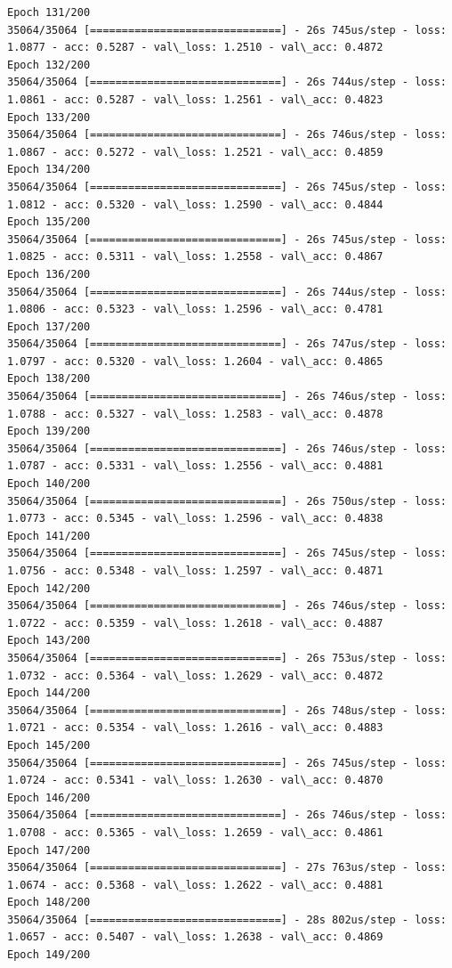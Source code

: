 \documentclass[11pt]{article}
\begin{document}
\begin{Verbatim}[commandchars=\\\{\}]
Epoch 131/200
35064/35064 [==============================] - 26s 745us/step - loss: 1.0877 - acc: 0.5287 - val\_loss: 1.2510 - val\_acc: 0.4872
Epoch 132/200
35064/35064 [==============================] - 26s 744us/step - loss: 1.0861 - acc: 0.5287 - val\_loss: 1.2561 - val\_acc: 0.4823
Epoch 133/200
35064/35064 [==============================] - 26s 746us/step - loss: 1.0867 - acc: 0.5272 - val\_loss: 1.2521 - val\_acc: 0.4859
Epoch 134/200
35064/35064 [==============================] - 26s 745us/step - loss: 1.0812 - acc: 0.5320 - val\_loss: 1.2590 - val\_acc: 0.4844
Epoch 135/200
35064/35064 [==============================] - 26s 745us/step - loss: 1.0825 - acc: 0.5311 - val\_loss: 1.2558 - val\_acc: 0.4867
Epoch 136/200
35064/35064 [==============================] - 26s 744us/step - loss: 1.0806 - acc: 0.5323 - val\_loss: 1.2596 - val\_acc: 0.4781
Epoch 137/200
35064/35064 [==============================] - 26s 747us/step - loss: 1.0797 - acc: 0.5320 - val\_loss: 1.2604 - val\_acc: 0.4865
Epoch 138/200
35064/35064 [==============================] - 26s 746us/step - loss: 1.0788 - acc: 0.5327 - val\_loss: 1.2583 - val\_acc: 0.4878
Epoch 139/200
35064/35064 [==============================] - 26s 746us/step - loss: 1.0787 - acc: 0.5331 - val\_loss: 1.2556 - val\_acc: 0.4881
Epoch 140/200
35064/35064 [==============================] - 26s 750us/step - loss: 1.0773 - acc: 0.5345 - val\_loss: 1.2596 - val\_acc: 0.4838
Epoch 141/200
35064/35064 [==============================] - 26s 745us/step - loss: 1.0756 - acc: 0.5348 - val\_loss: 1.2597 - val\_acc: 0.4871
Epoch 142/200
35064/35064 [==============================] - 26s 746us/step - loss: 1.0722 - acc: 0.5359 - val\_loss: 1.2618 - val\_acc: 0.4887
Epoch 143/200
35064/35064 [==============================] - 26s 753us/step - loss: 1.0732 - acc: 0.5364 - val\_loss: 1.2629 - val\_acc: 0.4872
Epoch 144/200
35064/35064 [==============================] - 26s 748us/step - loss: 1.0721 - acc: 0.5354 - val\_loss: 1.2616 - val\_acc: 0.4883
Epoch 145/200
35064/35064 [==============================] - 26s 745us/step - loss: 1.0724 - acc: 0.5341 - val\_loss: 1.2630 - val\_acc: 0.4870
Epoch 146/200
35064/35064 [==============================] - 26s 746us/step - loss: 1.0708 - acc: 0.5365 - val\_loss: 1.2659 - val\_acc: 0.4861
Epoch 147/200
35064/35064 [==============================] - 27s 763us/step - loss: 1.0674 - acc: 0.5368 - val\_loss: 1.2622 - val\_acc: 0.4881
Epoch 148/200
35064/35064 [==============================] - 28s 802us/step - loss: 1.0657 - acc: 0.5407 - val\_loss: 1.2638 - val\_acc: 0.4869
Epoch 149/200

\end{Verbatim}
\end{document}
